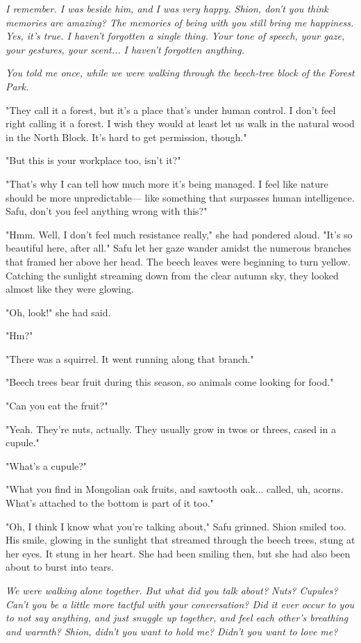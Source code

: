 \emph{I remember. I was beside him, and I was very happy. Shion, don't you
think memories are amazing? The memories of being with you still bring
me happiness. Yes, it's true. I haven't forgotten a single thing. Your
tone of speech, your gaze, your gestures, your scent... I haven't
forgotten anything.}

\emph{You told me once, while we were walking through the beech-tree block of
the Forest Park.}

"They call it a forest, but it's a place that's under human control. I
don't feel right calling it a forest. I wish they would at least let us
walk in the natural wood in the North Block. It's hard to get
permission, though."

"But this is your workplace too, isn't it?"

"That's why I can tell how much more it's being managed. I feel like
nature should be more unpredictable--- like something that surpasses human
intelligence. Safu, don't you feel anything wrong with this?"

"Hmm. Well, I don't feel much resistance really," she had pondered
aloud. "It's so beautiful here, after all." Safu let her gaze wander
amidst the numerous branches that framed her above her head. The beech
leaves were beginning to turn yellow. Catching the sunlight streaming
down from the clear autumn sky, they looked almost like they were
glowing.

"Oh, look!" she had said.

"Hm?"

"There was a squirrel. It went running along that branch."

"Beech trees bear fruit during this season, so animals come looking for
food."

"Can you eat the fruit?"

"Yeah. They're nuts, actually. They usually grow in twos or threes,
cased in a cupule."

"What's a cupule?"

"What you find in Mongolian oak fruits, and sawtooth oak... called, uh,
acorns. What's attached to the bottom is part of it too."

"Oh, I think I know what you're talking about," Safu grinned. Shion
smiled too. His smile, glowing in the sunlight that streamed through the
beech trees, stung at her eyes. It stung in her heart. She had been
smiling then, but she had also been about to burst into tears.

\emph{We were walking alone together. But what did you talk about? Nuts?
Cupules? Can't you be a little more tactful with your conversation? Did
it ever occur to you to not say anything, and just snuggle up together,
and feel each other's breathing and warmth? Shion, didn't you want to
hold me? Didn't you want to love me?}

